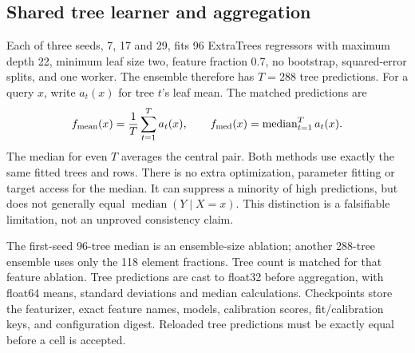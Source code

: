 \documentclass[11pt]{article}
\begin{document}
\subsection{Shared tree learner and aggregation}
Each of three seeds, 7, 17 and 29, fits 96 ExtraTrees regressors with maximum depth 22, minimum leaf size two, feature fraction 0.7, no bootstrap, squared-error splits, and one worker. The ensemble therefore has $T=288$ tree predictions. For a query $x$, write $a_t(x)$ for tree $t$'s leaf mean. The matched predictions are
\begin{equation}
 f_{\rm mean}(x)=\frac{1}{T}\sum_{t=1}^{T}a_t(x),\qquad
 f_{\rm med}(x)=\operatorname{median}_{t=1}^{T}a_t(x).
\end{equation}
The median for even $T$ averages the central pair. Both methods use exactly the same fitted trees and rows. There is no extra optimization, parameter fitting or target access for the median. It can suppress a minority of high predictions, but does not generally equal $\operatorname{median}(Y\mid X=x)$. This distinction is a falsifiable limitation, not an unproved consistency claim.

The first-seed 96-tree median is an ensemble-size ablation; another 288-tree ensemble uses only the 118 element fractions. Tree count is matched for that feature ablation. Tree predictions are cast to float32 before aggregation, with float64 means, standard deviations and median calculations. Checkpoints store the featurizer, exact feature names, models, calibration scores, fit/calibration keys, and configuration digest. Reloaded tree predictions must be exactly equal before a cell is accepted.
\end{document}
